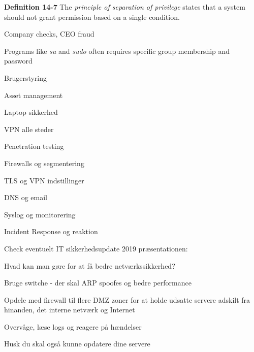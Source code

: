 \documentclass[Screen16to9,17pt]{foils}
\begin{document}

\begin{list1}
\item {\bf Definition 14-7} The \emph{principle of separation of privilege} states that a system should not grant permission based on a single condition.
\item Company checks, CEO fraud
\item Programs like \emph{su} and \emph{sudo} often requires specific group membership and password
\end{list1}


\begin{list2}
\item Brugerstyring
\item Asset management
\item Laptop sikkerhed
\item VPN alle steder
\item Penetration testing
\item Firewalls og segmentering
\item TLS og VPN indstillinger
\item DNS og email
\item Syslog og monitorering
\item Incident Response og reaktion
\end{list2}

Check eventuelt IT sikkerhedsupdate 2019 præsentationen:\\
{\small{}}


\begin{list1}
\item Hvad kan man gøre for at få bedre netværkssikkerhed?
\begin{list2}
\item Bruge switche - der skal ARP spoofes og bedre performance
\item Opdele med firewall til flere DMZ zoner for at holde
      udsatte servere adskilt fra hinanden, det interne netværk og
      Internet
\item Overvåge, læse logs og reagere på hændelser
\end{list2}
\item Husk du skal også kunne opdatere dine servere
\end{list1}
\end{document}
